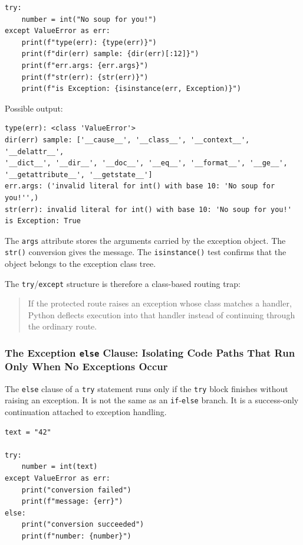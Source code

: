 \begin{verbatim}
try:
    number = int("No soup for you!")
except ValueError as err:
    print(f"type(err): {type(err)}")
    print(f"dir(err) sample: {dir(err)[:12]}")
    print(f"err.args: {err.args}")
    print(f"str(err): {str(err)}")
    print(f"is Exception: {isinstance(err, Exception)}")
\end{verbatim}

Possible output:

\begin{verbatim}
type(err): <class 'ValueError'>
dir(err) sample: ['__cause__', '__class__', '__context__', '__delattr__',
'__dict__', '__dir__', '__doc__', '__eq__', '__format__', '__ge__',
'__getattribute__', '__getstate__']
err.args: ('invalid literal for int() with base 10: 'No soup for you!'',)
str(err): invalid literal for int() with base 10: 'No soup for you!'
is Exception: True
\end{verbatim}

The \texttt{args} attribute stores the arguments carried by the exception object. The \texttt{str()} conversion gives the message. The \texttt{isinstance()} test confirms that the object belongs to the exception class tree.

The \texttt{try}/\texttt{except} structure is therefore a class-based routing trap:

\begin{quote}
If the protected route raises an exception whose class matches a handler, Python deflects execution into that handler instead of continuing through the ordinary route.
\end{quote}

\subsubsection{The Exception \texttt{else} Clause: Isolating Code Paths That Run Only When No Exceptions Occur}

The \texttt{else} clause of a \texttt{try} statement runs only if the \texttt{try} block finishes without raising an exception. It is not the same as an \texttt{if}-\texttt{else} branch. It is a success-only continuation attached to exception handling.

\begin{verbatim}
text = "42"

try:
    number = int(text)
except ValueError as err:
    print("conversion failed")
    print(f"message: {err}")
else:
    print("conversion succeeded")
    print(f"number: {number}")
\end{verbatim}

